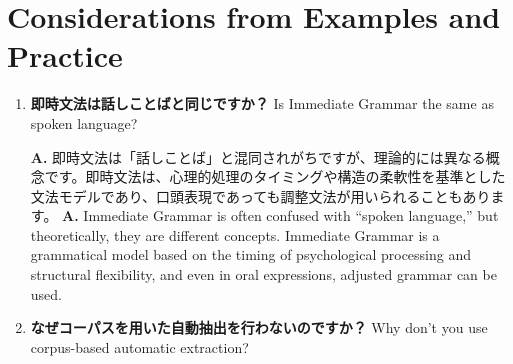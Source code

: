   \section{Considerations from Examples and Practice}
\fi





\begin{enumerate}[resume, label=\textbf{Q\arabic*.}, leftmargin=2em]

  \item \label{qa:20250406a}
\ifJPN
  \textbf{即時文法は話しことばと同じですか？}
\else
  Is Immediate Grammar the same as spoken language?
\fi

\ifJPN
  \textbf{A.} 即時文法は「話しことば」と混同されがちですが、理論的には異なる概念です。即時文法は、心理的処理のタイミングや構造の柔軟性を基準とした文法モデルであり、口頭表現であっても調整文法が用いられることもあります。
\else
  \textbf{A.} Immediate Grammar is often confused with ``spoken language,'' but theoretically, they are different concepts.
  Immediate Grammar is a grammatical model based on the timing of psychological processing and structural flexibility, and even in oral expressions, adjusted grammar can be used.
\fi

  \item \label{qa:20250406b}
\ifJPN
  \textbf{なぜコーパスを用いた自動抽出を行わないのですか？}
\else
  Why don't you use corpus-based automatic extraction?
\fi


\end{enumerate}
